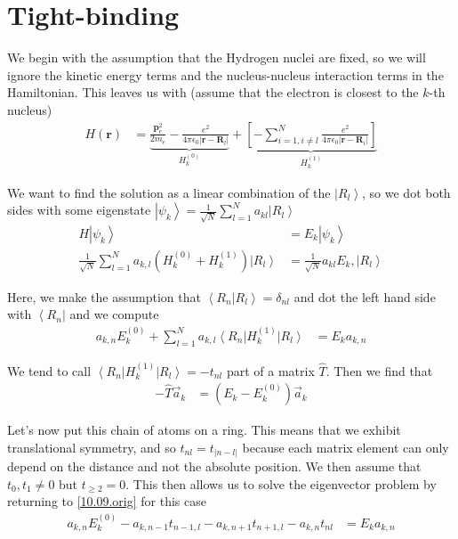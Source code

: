 \documentclass[10pt]{report}
\newcommand{\bra}[1]{\left<#1\right|}
\newcommand{\ket}[1]{\left|#1\right>}
\newcommand{\dotp}[2]{\left<#1\left.\right|#2\right>}
\newcommand{\abs}[1]{\left|#1\right|}
\begin{document}
\section{Tight-binding}

We begin with the assumption that the Hydrogen nuclei are fixed, so we will ignore the kinetic energy terms and the nucleus-nucleus interaction terms in the Hamiltonian. This leaves us with (assume that the electron is closest to the $k$-th nucleus)
\begin{align}
    H(\mathbf{r}) &= \underbrace{\frac{\mathbf{p}_e^2}{2m_e} - \frac{e^2}{4\pi\epsilon_0\abs{\mathbf{r} - \mathbf{R}_l}}}_{H^{(0)}_k} + \underbrace{\left[-\sum\limits_{i=1, i \neq l}^{N} \frac{e^2}{4\pi\epsilon_0\abs{\mathbf{r} - \mathbf{R}_i}}\right]}_{H^{(1)}_k}
\end{align}

We want to find the solution as a linear combination of the $\ket{R_l}$, so we dot both sides with some eigenstate $\ket{\psi_k} = \frac{1}{\sqrt{N}}\sum\limits_{l=1}^{N}a_{kl}\ket{R_l}$ 
\begin{align}
    H\ket{\psi_k} &= E_k\ket{\psi_k}\\
    \frac{1}{\sqrt{N}}\sum\limits_{l=1}^{N} a_{k,l} \left(H_k^{(0)} + H_k^{(1)}\right)\ket{R_l} &= \frac{1}{\sqrt{N}}a_{kl}E_k,\ket{R_l}
\end{align}

Here, we make the assumption that $\dotp{R_n}{R_l} = \delta_{nl}$ and dot the left hand side with $\bra{R_n}$ and we compute
\begin{align}
    a_{k,n}E^{(0)}_k + \sum\limits_{l=1}^{N}a_{k,l}\bra{R_n}H_k^{(1)}\ket{R_l} &= E_ka_{k,n} \label{10.09.orig}
\end{align}

We tend to call $\bra{R_n}H_k^{(1)}\ket{R_l} = -t_{nl}$ part of a matrix $\hat{T}$. Then we find that
\begin{align}
    -\hat{T} \vec{a}_k &= \left( E_k - E_k^{(0)} \right) \vec{a}_k
\end{align}

Let's now put this chain of atoms on a ring. This means that we exhibit translational symmetry, and so $t_{nl} = t_{\abs{n-l}}$ because each matrix element can only depend on the distance and not the absolute position. We then assume that $t_0, t_1 \neq 0$ but $t_{\geq 2} = 0$. This then allows us to solve the eigenvector problem by returning to \eqref{10.09.orig} for this case
\begin{align}
    a_{k,n}E^{(0)}_k - a_{k,n-1}t_{n-1,l} - a_{k,n+1}t_{n+1,l} - a_{k,n}t_{nl} &= E_ka_{k,n}
\end{align}
\end{document}
